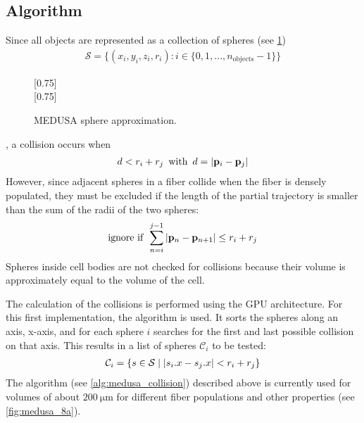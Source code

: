 \subsection{Algorithm}
%
Since all objects are represented as a collection of spheres (see \cref{fig:medusaCell})
\begin{align}
    \mathcal{S} = \{ (x_i,y_i,z_i,r_i) : i \in \{0, 1, ..., n_\text{objects}-1\}  \}
\end{align}
%
\begin{figure}[!t]
    \centering
    \setlength{\tikzwidth}{0.75\textwidth}
    [0.75\textwidth]{}
    \\[2em]
    [0.75\textwidth]{}
    \caption{\ac{MEDUSA} sphere approximation.}
    \label{fig:medusaCell}
\end{figure}
%
, a collision occurs when
%
\begin{align}
d<r_i+r_j \enspace \text{with} \enspace d = \lvert\mathbf{p}_i - \mathbf{p}_j\rvert
\end{align}
%
However, since adjacent spheres in a fiber collide when the fiber is densely populated, they must be excluded if the length of the partial trajectory is smaller than the sum of the radii of the two spheres:
\begin{align}
\text{ignore if} \enspace \sum_{n=i}^{j-1} \, \lvert\mathbf{p}_n - \mathbf{p}_{n+1}\rvert \leq  r_i + r_j 
\end{align}
%
Spheres inside cell bodies are not checked for collisions because their volume is approximately equal to the volume of the cell.
\par
%
The calculation of the collisions is performed using the GPU architecture.
For this first implementation, the algorithm  \cite{Karras2012} is used.
It sorts the spheres along an axis, \obda{} x-axis, and for each sphere $i$ searches for the first and last possible collision on that axis.
This results in a list of spheres $\mathcal{C}_i$ to be tested:
\begin{align}
\begin{split}
\mathcal{C}_i = \{ s \in \mathcal{S} \mid \lvert s_i.x - s_j.x\rvert < r_i+r_j \}
\end{split}
\end{align}
%
The algorithm (see \cref{alg:medusa_collision}) described above is currently used for volumes of about $\SI{200}{\micro\meter}$ for different fiber populations and other properties (see \cref{fig:medusa_8a}).
